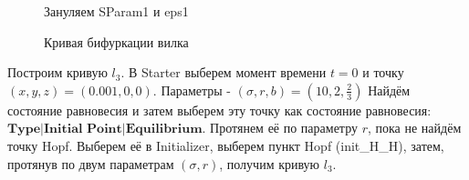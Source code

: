 \documentclass[12pt, a4paper]{article}
\begin{document}
\begin{figure}[H]
	\caption{Зануляем SParam1 и eps1}
\end{figure}
\begin{figure}[H]
	\caption{Кривая бифуркации вилка}
\end{figure}
Построим кривую $l_3$.
\newline
В Starter выберем момент времени $t=0$ и точку $(x,y,z) = (0.001, 0, 0)$. Параметры - $(\sigma, r, b) = (10, 2, \frac{2}{3})$ Найдём состояние равновесия и затем выберем эту точку как состояние равновесия: $\textbf{Type|Initial Point|Equilibrium}$. Протянем её по параметру $r$, пока не найдём точку Hopf. Выберем её в Initializer, выберем пункт Hopf (init\_H\_H), затем, протянув по двум параметрам $(\sigma, r)$, получим кривую $l_3$.
\end{document}

